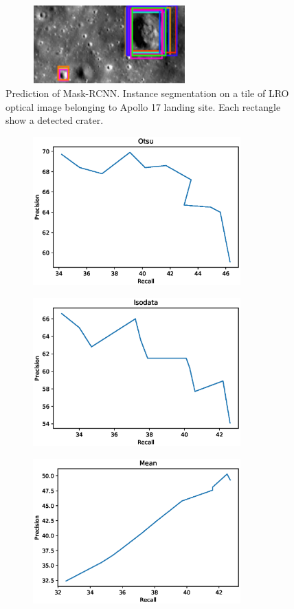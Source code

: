 \documentclass[11pt]{article}
\begin{document}
\begin{figure}[H]
	\centering
	\includegraphics[width=8cm, height=3cm]{files/results/mask.png}
	\caption{Prediction of Mask-RCNN. Instance segmentation on a tile of LRO optical image belonging to Apollo 17 landing site. Each rectangle show a detected crater.}
	\label{mask_rcnn}
\end{figure}
 
\begin{figure}[H]
	\begin{subfigure}{7cm}
		\centering\includegraphics[width=8cm]{files/results/otsu_roc.eps}
		\caption{}
	\end{subfigure}
	\begin{subfigure}{7cm}
		\centering\includegraphics[width=8cm]{files/results/isodata_roc.eps}
		\caption{}
	\end{subfigure}
	\begin{subfigure}{7cm}
		\centering\includegraphics[width=8cm]{files/results/mean_roc.eps}

\end{subfigure}
\end{figure}
\end{document}
